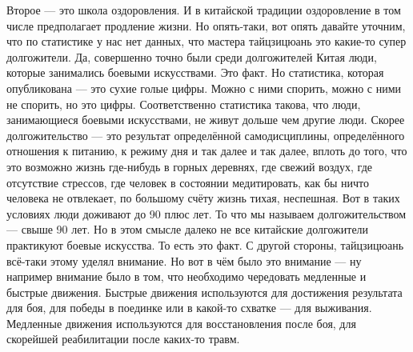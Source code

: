 Второе --- это школа оздоровления. И в китайской традиции оздоровление в том числе предполагает 
продление жизни. Но опять-таки, вот опять давайте уточним, что по статистике у нас нет 
данных, что мастера тайцзицюань это какие-то супер долгожители. Да, совершенно точно были 
среди долгожителей Китая люди, которые занимались боевыми искусствами. Это факт. Но 
статистика, которая опубликована --- это сухие голые цифры. Можно с ними спорить, можно с ними 
не спорить, но это цифры. Соответственно статистика такова, что люди, занимающиеся боевыми 
искусствами, не живут дольше чем другие люди. Скорее долгожительство --- это результат 
определённой самодисциплины, определённого отношения к питанию, к режиму дня и так далее и 
так далее, вплоть до того, что это возможно жизнь где-нибудь в горных деревнях, где свежий 
воздух, где отсутствие стрессов, где человек в состоянии медитировать, как бы ничто человека 
не отвлекает, по большому счёту жизнь тихая, неспешная. Вот в таких условиях люди доживают до 
90 плюс лет. То что мы называем долгожительством --- свыше 90 лет. Но в этом смысле далеко не все 
китайские долгожители практикуют боевые искусства. То есть это факт. С другой стороны,
тайцзицюань всё-таки этому уделял внимание. Но вот в чём было это внимание --- ну например внимание
было в том, что необходимо чередовать медленные и быстрые движения. Быстрые движения 
используются для достижения результата для боя, для победы в поединке или в 
какой-то схватке --- для выживания. Медленные движения используются для восстановления 
после боя, для скорейшей реабилитации после каких-то травм.

